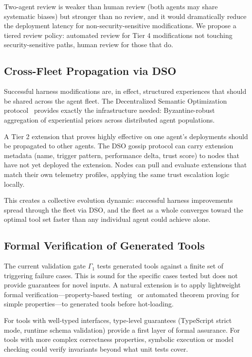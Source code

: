 Two-agent review is weaker than human review (both agents may share systematic
biases) but stronger than no review, and it would dramatically reduce the
deployment latency for non-security-sensitive modifications. We propose a
tiered review policy: automated review for Tier 4 modifications not touching
security-sensitive paths, human review for those that do.

\subsection{Cross-Fleet Propagation via DSO}
\label{sec:dso-propagation}

Successful harness modifications are, in effect, structured experiences that
should be shared across the agent fleet. The Decentralized Semantic Optimization
protocol~\cite{hanzo2026dso} provides exactly the infrastructure needed:
Byzantine-robust aggregation of experiential priors across distributed agent
populations.

A Tier 2 extension that proves highly effective on one agent's deployments
should be propagated to other agents. The DSO gossip protocol can carry
extension metadata (name, trigger pattern, performance delta, trust score) to
nodes that have not yet deployed the extension. Nodes can pull and evaluate
extensions that match their own telemetry profiles, applying the same trust
escalation logic locally.

This creates a collective evolution dynamic: successful harness improvements
spread through the fleet via DSO, and the fleet as a whole converges toward
the optimal tool set faster than any individual agent could achieve alone.

\subsection{Formal Verification of Generated Tools}
\label{sec:verification}

The current validation gate $\Gamma_1$ tests generated tools against a finite
set of triggering failure cases. This is sound for the specific cases tested
but does not provide guarantees for novel inputs. A natural extension is to
apply lightweight formal verification---property-based testing~\cite{claessen2000quickcheck}
or automated theorem proving for simple properties---to generated tools before
hot-loading.

For tools with well-typed interfaces, type-level guarantees (TypeScript strict
mode, runtime schema validation) provide a first layer of formal assurance.
For tools with more complex correctness properties, symbolic execution or
model checking could verify invariants beyond what unit tests cover.

